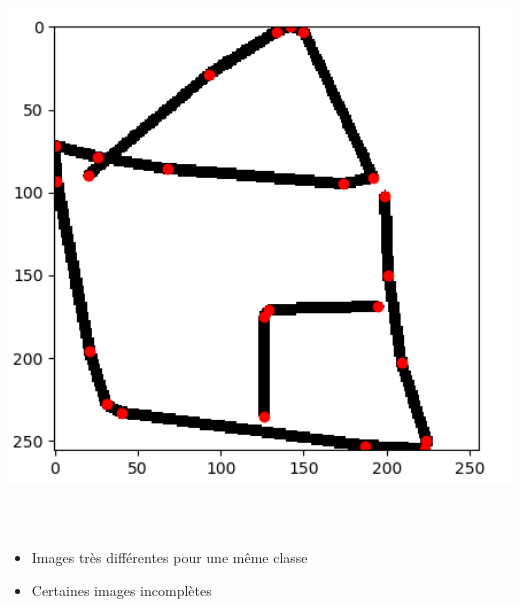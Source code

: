 \begin{center}
\includegraphics[width=15cm,height=15cm,keepaspectratio]{figures/housedraw.png}
\end{center}




\vspace{4mm}




\centering
\begin{itemize}
\item Images très différentes pour une même classe
\item Certaines images incomplètes
\end{itemize}

